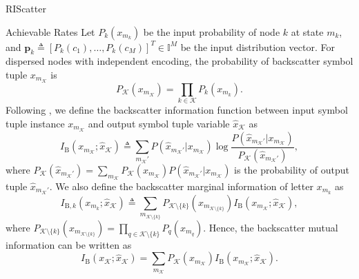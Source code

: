 \documentclass[journal]{IEEEtran}
\begin{document}
\begin{section}{RIScatter}
	\begin{subsection}{Achievable Rates}
		Let $P_k(x_{m_k})$ be the input probability of node $k$ at state $m_k$, and $\boldsymbol{p}_k \triangleq [P_k(c_1),\ldots,P_k(c_M)]^T \in \mathbb{I}^{M}$ be the input distribution vector.
		For dispersed nodes with independent encoding, the probability of backscatter symbol tuple $x_{m_{\mathcal{K}}}$ is
		\begin{equation}
			P_{\mathcal{K}}(x_{m_{\mathcal{K}}}) = \prod_{k \in \mathcal{K}} P_k(x_{m_k}).
			\label{eq:equivalent_distribution}
		\end{equation}
		Following \cite{Rezaeian2004}, we define the backscatter information function between input symbol tuple instance $x_{m_{\mathcal{K}}}$ and output symbol tuple variable $\hat{x}_{\mathcal{K}}$ as
		\begin{equation}
			I_{\mathrm{B}}(x_{m_{\mathcal{K}}};\hat{x}_{\mathcal{K}}) \triangleq \sum_{m_{\mathcal{K}}'} P(\hat{x}_{m_{\mathcal{K}}'}|x_{m_{\mathcal{K}}}) \log \frac{P(\hat{x}_{m_{\mathcal{K}}'}|x_{m_{\mathcal{K}}})}{P_{\mathcal{K}}(\hat{x}_{m_{\mathcal{K}}'})},
			\label{eq:backscatter_information_function}
		\end{equation}
		where $P_{\mathcal{K}}(\hat{x}_{m_{\mathcal{K}}'}) = \sum_{m_{\mathcal{K}}} P_{\mathcal{K}}(x_{m_{\mathcal{K}}}) P(\hat{x}_{m_{\mathcal{K}}'}|x_{m_{\mathcal{K}}})$ is the probability of output tuple $\hat{x}_{m_{\mathcal{K}}'}$.
		We also define the backscatter marginal information of letter $x_{m_k}$ as
		\begin{equation}
			I_{\mathrm{B},k}(x_{m_k};\hat{x}_{\mathcal{K}}) \triangleq \sum_{m_{\mathcal{K} \setminus \{k\}}} P_{\mathcal{K} \setminus \{k\}}(x_{m_{\mathcal{K} \setminus \{k\}}}) I_{\mathrm{B}}(x_{m_{\mathcal{K}}};\hat{x}_{\mathcal{K}}),
			\label{eq:backscatter_marginal_information}
		\end{equation}
		where $P_{\mathcal{K} \setminus \{k\}}(x_{m_{\mathcal{K} \setminus \{k\}}}) = \prod_{q \in \mathcal{K} \setminus \{k\}} P_{q}(x_{m_{q}})$.
		Hence, the backscatter mutual information can be written as
		\begin{equation}
			I_{\mathrm{B}}(x_{\mathcal{K}};\hat{x}_{\mathcal{K}}) = \sum_{m_{\mathcal{K}}} P_{\mathcal{K}}(x_{m_{\mathcal{K}}}) I_{\mathrm{B}}(x_{m_{\mathcal{K}}};\hat{x}_{\mathcal{K}}).
			\label{eq:backscatter_mutual_information}
		\end{equation}


\end{subsection}
\end{section}
\end{document}
